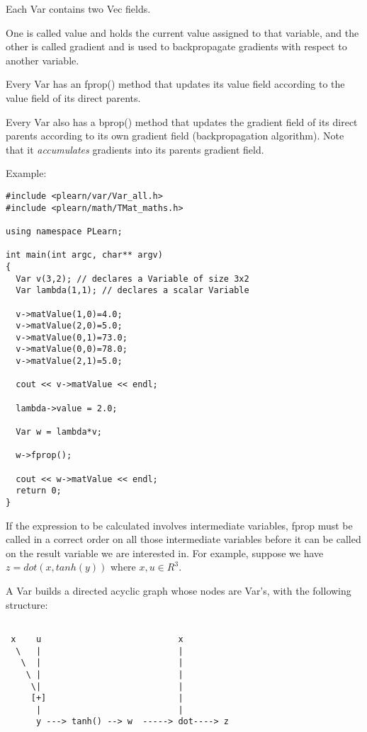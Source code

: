 \documentclass[11pt]{book}
\begin{document}
 Each Var contains two Vec fields. 
 
 One is called value and holds the current value assigned to that variable, and the other is called gradient and is used to backpropagate gradients with respect to another variable.
 
 Every Var has an fprop() method that updates its value field according to the value field of its direct parents.
 
 Every Var also has a bprop() method that updates the gradient field of its direct parents according to its own gradient field (backpropagation algorithm). Note that it \emph{accumulates} gradients into its parents gradient field. 

 Example: 
 
\begin{verbatim}
#include <plearn/var/Var_all.h>
#include <plearn/math/TMat_maths.h>

using namespace PLearn;

int main(int argc, char** argv)
{
  Var v(3,2); // declares a Variable of size 3x2
  Var lambda(1,1); // declares a scalar Variable

  v->matValue(1,0)=4.0;
  v->matValue(2,0)=5.0;
  v->matValue(0,1)=73.0;
  v->matValue(0,0)=78.0;
  v->matValue(2,1)=5.0;

  cout << v->matValue << endl;

  lambda->value = 2.0;

  Var w = lambda*v;

  w->fprop();

  cout << w->matValue << endl;
  return 0;
}
\end{verbatim}


 If the expression to be calculated involves intermediate variables, fprop must be called in a correct order on all those intermediate variables before it can be called on the result variable we are interested in. For example, suppose we have $z=dot(x,tanh(y))$ where $x,u \in R^3$.

 
 A Var builds a directed acyclic graph whose nodes are Var's, with the following structure: 
\nopagebreak
\begin{verbatim}

 x    u                           x
  \   |                           |   
   \  |                           |  
    \ |                           |  
     \|                           |  
     [+]                          |
      |                           |           
      y ---> tanh() --> w  -----> dot----> z

\end{verbatim}
\end{document}
